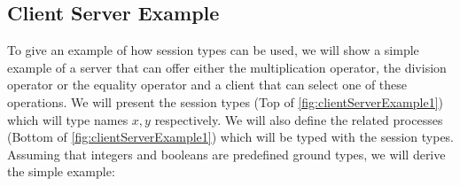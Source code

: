 
\subsection{Client Server Example}

To give an example of how session types can be used, we will show a simple example of a server that can offer either the multiplication operator, the division operator or the equality operator and a client that can select one of these operations. We will present the session types (Top of \autoref{fig:clientServerExample1}) which will type names $x, y$ respectively. We will also define the related processes (Bottom of \autoref{fig:clientServerExample1}) which will be typed with the session types. Assuming that integers and booleans are predefined ground types, we will derive the simple example:

